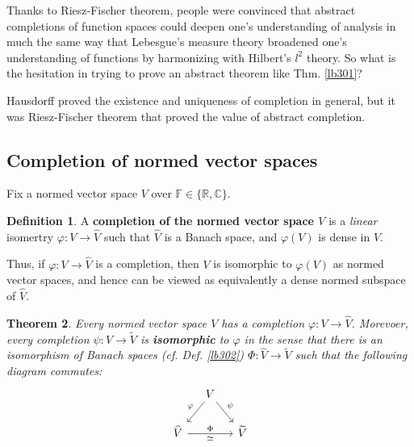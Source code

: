\documentclass[12pt,b5paper,notitlepage]{article}
\theoremstyle{definition}
\newtheorem{df}{Definition}[section]
\theoremstyle{plain}
\newtheorem{thm}[df]{Theorem}
\newcommand{\wtd}{\widetilde}
\newcommand{\wht}{\widehat}
\newcommand{\Cbb}{\mathbb C}
\newcommand{\Rbb}{\mathbb R}
\newcommand{\Fbb}{\mathbb F}
\numberwithin{equation}{section}
\begin{document}
Thanks to Riesz-Fischer theorem, people were convinced that abstract completions of function spaces could deepen one's understanding of analysis in much the same way that Lebesgue's measure theory broadened one's understanding of functions by harmonizing with Hilbert's $l^2$ theory. So what is the hesitation in trying to prove an abstract theorem like Thm. \ref{lb301}?

Hausdorff proved the existence and uniqueness of completion in general, but it was Riesz-Fischer theorem that proved the value of abstract completion.



\subsection{Completion of normed vector spaces}

Fix a normed vector space $V$ over $\Fbb\in\{\Rbb,\Cbb\}$.

\begin{df}
A \textbf{completion of the normed vector space $V$}  is a \textit{linear} isomertry $\varphi:V\rightarrow\wht{V}$ such that $\wht{V}$ is a Banach space, and $\varphi(V)$ is dense in $\wht V$.
\end{df}

Thus, if $\varphi:V\rightarrow\wht V$ is a completion, then $V$ is isomorphic to $\varphi(V)$ as normed vector spaces, and hence can be viewed as equivalently a dense normed subspace of $\wht V$.



\begin{thm}\label{lb312}
Every normed vector space $V$ has a completion $\varphi:V\rightarrow\wht V$. Morevoer, every completion $\psi:V\rightarrow\wtd V$ is \textbf{isomorphic} to $\varphi$ in the sense that there is an isomorphism of Banach spaces (cf. Def. \ref{lb302}) $\Phi:\wht V\rightarrow\wtd V$ such that the following diagram commutes:
\begin{equation}
\begin{tikzcd}[column sep=small]
                     & V \arrow[ld,"\varphi"'] \arrow[rd,"\psi"] &   \\
\wht V \arrow[rr, "\Phi","\simeq"'] &                         & \wtd V
\end{tikzcd}
\end{equation}
\end{thm}

\end{document}
